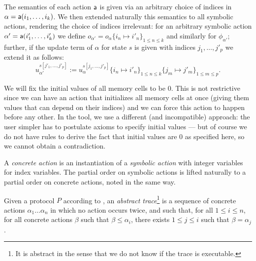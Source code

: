 
The semantics of each action $\textsf{a}$ is given via an arbitrary
choice of indices in $\alpha = \textsf{a}(i_1,\ldots,i_k)$.
We then extended naturally this semantics to all symbolic actions,
rendering the choice of indices irrelevant:
for an arbitrary symbolic action $\alpha' =
\textsf{a}(i'_1,\ldots,i'_k)$ we define
$o_{\alpha'} = o_\alpha\{i_n\mapsto i'_n\}_{1\leq n \leq k}$
and similarly for $\phi_{\alpha'}$;
further, if the update term of $\alpha$ for state $s$ is given
with indices $j_1,\ldots,j'_p$ we extend it as follows:
$$ u_{\alpha'}^{s[j'_1,\ldots,j'_p]} :=
   u_\alpha^{s[j_1,\ldots,j'_p]}\{i_n\mapsto i'_n\}_{1 \leq n \leq k} 
                                \{j_m\mapsto j'_m\}_{1 \leq m \leq p}.$$

\begin{remark}
  We will fix the initial values of all memory cells to be $0$.
  This is not restrictive since we can have an action that initializes
  all memory cells at once (giving them values that can depend on their
  indices) and we can force this action to happen before any other.
  In the tool, we use a different (and incompatible) approach:
  the user simpler has to postulate axioms to specify initial values
  --- but of course we do not have rules to derive the fact that initial
  values are $0$ as specified here, so we cannot obtain a contradiction.
\end{remark}

\begin{definition}
  A \emph{concrete action} is an instantiation of a \emph{symbolic action}
  with integer variables for index variables. The partial order on symbolic
  actions is lifted naturally to a partial order on concrete actions, noted
  in the same way.
\end{definition}

\begin{definition}
  \label{def:trace}
  Given a protocol $P$ according to ,
  an \emph{abstract trace}\footnote{
    It is abstract in the sense that we do not know if the trace
    is executable.} is a sequence of concrete actions
  $\alpha_1 \dots \alpha_n$
  in which no action occurs twice, and such that,
  for all $1 \leq i \leq n$,
  for all concrete actions $\beta$ such that $\beta \leq \alpha_i$,
  there exists $1 \leq j \leq i$ such that $\beta = \alpha_j$.
\end{definition}

